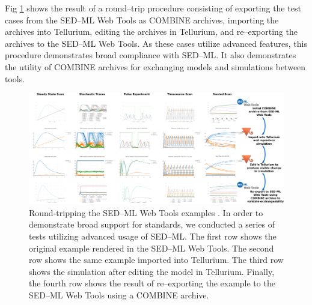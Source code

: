 \documentclass[10pt,letterpaper]{article}
\begin{document}
Fig \ref{fig:swt-roundtrip} shows the result of a round--trip procedure consisting of exporting the test cases from the SED--ML Web Tools as COMBINE archives, importing the archives into Tellurium, editing the archives in Tellurium, and re--exporting the archives to the SED--ML Web Tools. As these cases utilize advanced features, this procedure demonstrates broad compliance with SED--ML. It also demonstrates the utility of COMBINE archives for exchanging models and simulations between tools.

\begin{figure}
  \includegraphics[width=\textwidth]{swt-roundtrip.pdf}
  \caption{Round-tripping the SED--ML Web Tools examples \cite{bergmann2017sed}. In order to demonstrate broad support for standards, we conducted a series of tests utilizing advanced usage of SED--ML. The first row shows the original example rendered in the SED--ML Web Tools. The second row shows the same example imported into Tellurium. The third row shows the simulation after editing the model in Tellurium. Finally, the fourth row shows the result of re--exporting the example to the SED--ML Web Tools using a COMBINE archive. }
  \label{fig:swt-roundtrip}
\end{figure}
\end{document}

